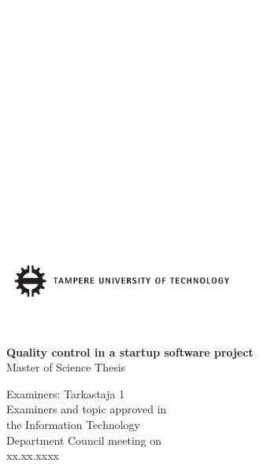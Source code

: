  
\thispagestyle{empty}
 
\vspace*{-.5cm}\noindent
 
 
\includegraphics[width=8cm]{tillbehor/tut-logo}
 
\vspace{6.8cm}
 
\\
{\bf\large \textsf{Quality control in a startup software project}}\\
\textsf{Master of Science Thesis}
 
\vspace{8.7cm} %
 
\begin{flushright}
  
\begin{minipage}[c]{6.8cm}
\begin{spacing}{1.0}
\textsf{Examiners: Tarkastaja 1}\\
\textsf{Examiners and topic approved in}\\ 
\textsf{the Information Technology}\\
\textsf{Department Council meeting on}\\
\textsf{xx.xx.xxxx}\\
\end{spacing}
\end{minipage}
\end{flushright}
 
